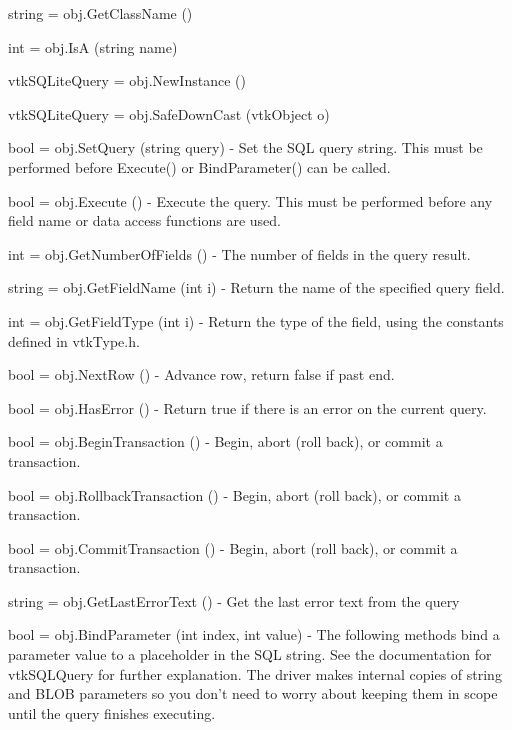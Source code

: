 \begin{DoxyItemize}
\item {\ttfamily string = obj.\-Get\-Class\-Name ()}  
\item {\ttfamily int = obj.\-Is\-A (string name)}  
\item {\ttfamily vtk\-S\-Q\-Lite\-Query = obj.\-New\-Instance ()}  
\item {\ttfamily vtk\-S\-Q\-Lite\-Query = obj.\-Safe\-Down\-Cast (vtk\-Object o)}  
\item {\ttfamily bool = obj.\-Set\-Query (string query)} -\/ Set the S\-Q\-L query string. This must be performed before Execute() or Bind\-Parameter() can be called.  
\item {\ttfamily bool = obj.\-Execute ()} -\/ Execute the query. This must be performed before any field name or data access functions are used.  
\item {\ttfamily int = obj.\-Get\-Number\-Of\-Fields ()} -\/ The number of fields in the query result.  
\item {\ttfamily string = obj.\-Get\-Field\-Name (int i)} -\/ Return the name of the specified query field.  
\item {\ttfamily int = obj.\-Get\-Field\-Type (int i)} -\/ Return the type of the field, using the constants defined in vtk\-Type.\-h.  
\item {\ttfamily bool = obj.\-Next\-Row ()} -\/ Advance row, return false if past end.  
\item {\ttfamily bool = obj.\-Has\-Error ()} -\/ Return true if there is an error on the current query.  
\item {\ttfamily bool = obj.\-Begin\-Transaction ()} -\/ Begin, abort (roll back), or commit a transaction.  
\item {\ttfamily bool = obj.\-Rollback\-Transaction ()} -\/ Begin, abort (roll back), or commit a transaction.  
\item {\ttfamily bool = obj.\-Commit\-Transaction ()} -\/ Begin, abort (roll back), or commit a transaction.  
\item {\ttfamily string = obj.\-Get\-Last\-Error\-Text ()} -\/ Get the last error text from the query  
\item {\ttfamily bool = obj.\-Bind\-Parameter (int index, int value)} -\/ The following methods bind a parameter value to a placeholder in the S\-Q\-L string. See the documentation for vtk\-S\-Q\-L\-Query for further explanation. The driver makes internal copies of string and B\-L\-O\-B parameters so you don't need to worry about keeping them in scope until the query finishes executing.  

\end{DoxyItemize}
